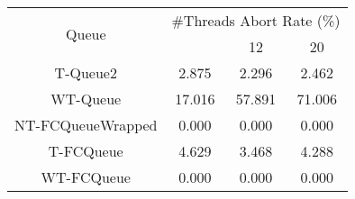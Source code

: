 \begin{tabular}{|c|c|c|c|}
\hline
\multirow{2}{*}{Queue} & \multicolumn{3}{c|}{\#Threads Abort Rate (\%)}\\\cline{2-4}& \quad 4 & 12 & 20\\
\hline
\hline
T-Queue2 & 2.875 & 2.296 & 2.462\\
WT-Queue & 17.016 & 57.891 & 71.006\\
NT-FCQueueWrapped & 0.000 & 0.000 & 0.000\\
T-FCQueue & 4.629 & 3.468 & 4.288\\
WT-FCQueue & 0.000 & 0.000 & 0.000\\
\hline\end{tabular}
